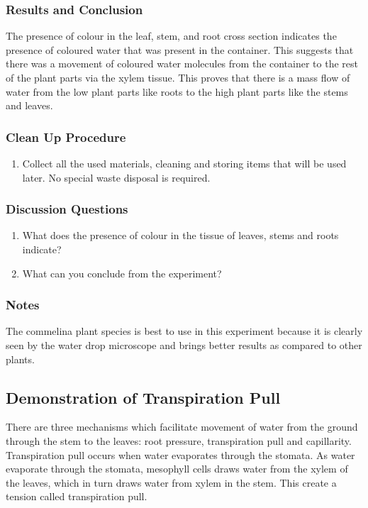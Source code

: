 \subsubsection*{Results and Conclusion}
The presence of colour in the leaf, stem, and root cross section indicates the presence of coloured water that was present in the container. This suggests that there was a movement of coloured water molecules from the container to the rest of the plant parts via the xylem tissue. This proves that there is a mass flow of water from the low plant parts like roots to the high plant parts like the stems and leaves.

\subsubsection*{Clean Up Procedure}
\begin{enumerate}
\item{Collect all the used materials, cleaning and storing items that will be used later. No special waste disposal is required.}
\end{enumerate}

\subsubsection*{Discussion Questions}
\begin{enumerate}
\item{What does the presence of colour in the tissue of leaves, stems and roots indicate?}
\item{What can you conclude from the experiment?}
\end{enumerate}

\subsubsection*{Notes}
 The commelina plant species is best to use in this experiment because it is clearly seen by the water drop microscope and brings better results as compared to other plants.

\subsection{Demonstration of Transpiration Pull}

There are three mechanisms which facilitate movement of water from the ground through the stem to the leaves: root pressure, transpiration pull and capillarity. Transpiration pull occurs when water evaporates through the stomata. As water evaporate through the stomata, mesophyll cells draws water from the xylem of the leaves, which in turn draws water from xylem in the stem. This create a tension called transpiration pull.

